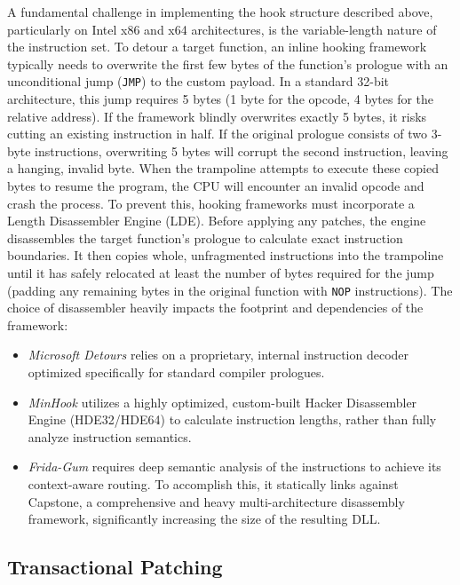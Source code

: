 A fundamental challenge in implementing the hook structure described above, particularly on Intel x86 and x64 architectures, is the variable-length nature of the instruction set.
To detour a target function, an inline hooking framework typically needs to overwrite the first few bytes of the function's prologue with an unconditional jump (\texttt{JMP}) to the custom payload.
In a standard 32-bit architecture, this jump requires 5 bytes (1 byte for the opcode, 4 bytes for the relative address).
If the framework blindly overwrites exactly 5 bytes, it risks cutting an existing instruction in half.
If the original prologue consists of two 3-byte instructions, overwriting 5 bytes will corrupt the second instruction, leaving a hanging, invalid byte.
When the trampoline attempts to execute these copied bytes to resume the program, the CPU will encounter an invalid opcode and crash the process.
To prevent this, hooking frameworks must incorporate a Length Disassembler Engine (LDE).
Before applying any patches, the engine disassembles the target function's prologue to calculate exact instruction boundaries.
It then copies whole, unfragmented instructions into the trampoline until it has safely relocated at least the number of bytes required for the jump (padding any remaining bytes in the original function with \texttt{NOP} instructions).
The choice of disassembler heavily impacts the footprint and dependencies of the framework:
\begin{itemize}
	\item \emph{Microsoft Detours} relies on a proprietary, internal instruction decoder optimized specifically for standard compiler prologues.
	\item \emph{MinHook} utilizes a highly optimized, custom-built Hacker Disassembler Engine \allowbreak (HDE32/\allowbreak HDE64) to calculate instruction lengths, rather than fully analyze instruction semantics.
	\item \emph{Frida-Gum} requires deep semantic analysis of the instructions to achieve its context-aware routing.
	To accomplish this, it statically links against Capstone, a comprehensive and heavy multi-architecture disassembly framework, significantly increasing the size of the resulting \ac{DLL}.
\end{itemize}

\subsection{Transactional Patching}
\label{subsec:transactional_patching}


